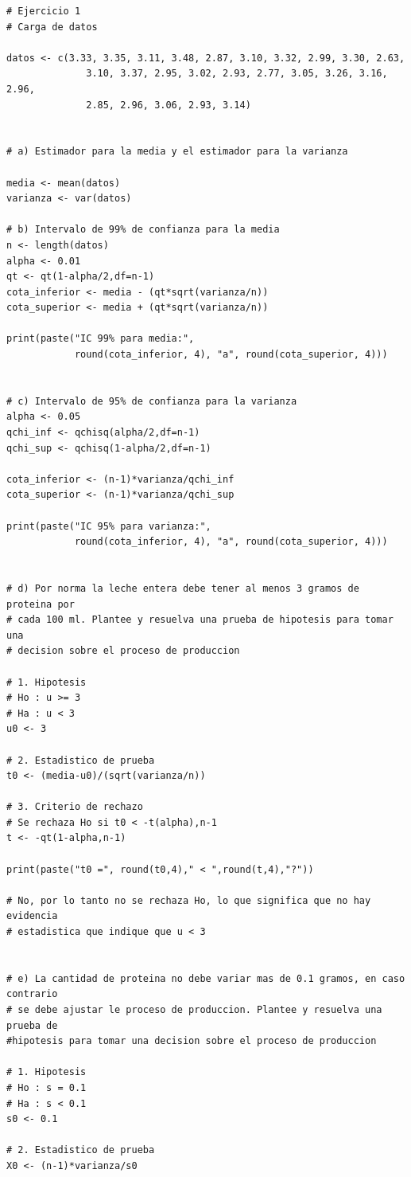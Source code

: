 \documentclass[12pt,a4paper]{article}
\begin{document}
\begin{lstlisting}
# Ejercicio 1
# Carga de datos

datos <- c(3.33, 3.35, 3.11, 3.48, 2.87, 3.10, 3.32, 2.99, 3.30, 2.63, 
              3.10, 3.37, 2.95, 3.02, 2.93, 2.77, 3.05, 3.26, 3.16, 2.96, 
              2.85, 2.96, 3.06, 2.93, 3.14)


# a) Estimador para la media y el estimador para la varianza

media <- mean(datos)
varianza <- var(datos)

# b) Intervalo de 99% de confianza para la media
n <- length(datos)
alpha <- 0.01
qt <- qt(1-alpha/2,df=n-1)
cota_inferior <- media - (qt*sqrt(varianza/n))
cota_superior <- media + (qt*sqrt(varianza/n))

print(paste("IC 99% para media:", 
            round(cota_inferior, 4), "a", round(cota_superior, 4)))


# c) Intervalo de 95% de confianza para la varianza
alpha <- 0.05
qchi_inf <- qchisq(alpha/2,df=n-1)
qchi_sup <- qchisq(1-alpha/2,df=n-1)

cota_inferior <- (n-1)*varianza/qchi_inf
cota_superior <- (n-1)*varianza/qchi_sup

print(paste("IC 95% para varianza:", 
            round(cota_inferior, 4), "a", round(cota_superior, 4)))


# d) Por norma la leche entera debe tener al menos 3 gramos de proteina por
# cada 100 ml. Plantee y resuelva una prueba de hipotesis para tomar una 
# decision sobre el proceso de produccion

# 1. Hipotesis
# Ho : u >= 3
# Ha : u < 3
u0 <- 3

# 2. Estadistico de prueba
t0 <- (media-u0)/(sqrt(varianza/n))

# 3. Criterio de rechazo
# Se rechaza Ho si t0 < -t(alpha),n-1
t <- -qt(1-alpha,n-1)

print(paste("t0 =", round(t0,4)," < ",round(t,4),"?"))

# No, por lo tanto no se rechaza Ho, lo que significa que no hay evidencia
# estadistica que indique que u < 3


# e) La cantidad de proteina no debe variar mas de 0.1 gramos, en caso contrario
# se debe ajustar le proceso de produccion. Plantee y resuelva una prueba de
#hipotesis para tomar una decision sobre el proceso de produccion

# 1. Hipotesis
# Ho : s = 0.1
# Ha : s < 0.1 
s0 <- 0.1

# 2. Estadistico de prueba
X0 <- (n-1)*varianza/s0


\end{lstlisting}
\end{document}
